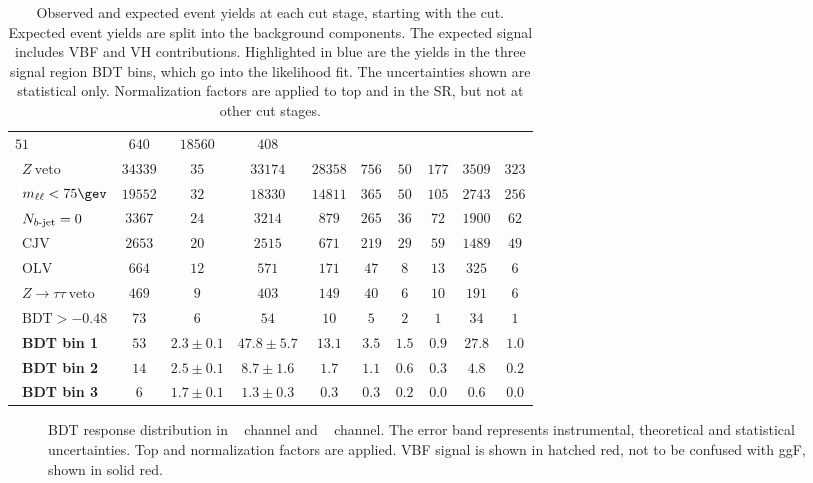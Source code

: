 \begin{table}[h]
\begin{center}
{\begin{tabular}{l || c c c | c c c c c c }
$51$ & $640$ & $18560$ & $408$ \\
\ $Z~\textrm{veto}$ & $34339$ & $35$ & $33174$ & $28358$ & $756$ & $50$
& $177$ & $3509$ & $323$ \\
\ $\mll < 75 \gev$ & $19552$ & $32$ & $18330$ & $14811$ & $365$ & $50$ &
$105$ & $2743$ & $256$ \\
\ $N_{b\textrm{-jet}} = 0$ & $3367$ & $24$ & $3214$ & $879$ & $265$ & $36$ & $72$ &
$1900$ & $62$ \\
\ $\textrm{CJV}$ & $2653$ & $20$ & $2515$ & $671$ & $219$ & $29$ & $59$
& $1489$ & $49$ \\
\ $\textrm{OLV}$ & $664$ & $12$ & $571$ & $171$ & $47$ & $8$ & $13$ &
$325$ & $6$ \\
\ $Z\rightarrow{\tau\tau}~\textrm{veto}$ & $469$ & $9$ & $403$ & $149$ &
$40$ & $6$ & $10$ & $191$ & $6$ \\
\ $\textrm{BDT} > -0.48$ & $73$ & $6$ & $54$ & $10$ & $5$ & $2$ & $1$ &
$34$ & $1$ \\
\hline
\ {\bf\color{blue}BDT bin 1} & $53$ & $2.3 \pm 0.1$ & $47.8 \pm 5.7$ & $13.1$
& $3.5$ & $1.5$ & $0.9$ & $27.8$ & $1.0$ \\
\ {\bf\color{blue}BDT bin 2} & $14$ & $2.5 \pm 0.1$ & $8.7 \pm 1.6$ & $1.7$ &
$1.1$ & $0.6$ & $0.3$ & $4.8$ & $0.2$ \\
\ {\bf\color{blue}BDT bin 3} & $6$ & $1.7 \pm 0.1$ & $1.3 \pm 0.3$ & $0.3$ &
$0.3$ & $0.2$ & $0.0$ & $0.6$ & $0.0$ \\
\hline
\end{tabular}
}
\caption[]{Observed and expected event yields at each cut stage,
starting with the \Njet cut. Expected event yields are split into the
background components. The expected signal includes VBF and VH
contributions. Highlighted in {\color{blue}blue} are the yields in the
three signal region BDT bins, which go into the likelihood fit. The uncertainties
shown are statistical only. Normalization factors are applied to top
and \ZDY in the SR, but not at other cut stages.}
\label{chap:analysis:tab:signal_region_cutflow}
\end{center}
\end{table}


\begin{figure}[h]
    \centering
    \caption[BDT response distributions.]{BDT response distribution in
    ~ \emme channel and
    ~ \eemm channel. The
    error band represents instrumental, theoretical and statistical
    uncertainties. Top and \ZDY normalization factors are applied. VBF
    signal is shown in hatched red, not to be confused with ggF, shown
    in solid red.}
\label{chap:analysis:fig:bdt_response}
\end{figure}

